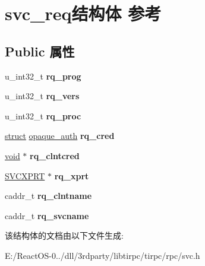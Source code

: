 \hypertarget{structsvc__req}{}\section{svc\+\_\+req结构体 参考}
\label{structsvc__req}
\subsection*{Public 属性}
\begin{DoxyCompactItemize}
\item 
\mbox{\label{structsvc__req_a0e8de24cec109d81d27debb3e7a718db}} 
u\+\_\+int32\+\_\+t {\bfseries rq\+\_\+prog}
\item 
\mbox{\label{structsvc__req_adc3f8c3e89ebdafdd6bf1cea8b033116}} 
u\+\_\+int32\+\_\+t {\bfseries rq\+\_\+vers}
\item 
\mbox{\label{structsvc__req_a3a9ae23ba2a7aa5790107cd16caaeaa9}} 
u\+\_\+int32\+\_\+t {\bfseries rq\+\_\+proc}
\item 
\mbox{\label{structsvc__req_a33e405bde020a2c8c2cecb6a4676103a}} 
\hyperlink{interfacestruct}{struct} \hyperlink{structopaque__auth}{opaque\+\_\+auth} {\bfseries rq\+\_\+cred}
\item 
\mbox{\label{structsvc__req_a29b1a269d90c61a61d71de14153e3135}} 
\hyperlink{interfacevoid}{void} $\ast$ {\bfseries rq\+\_\+clntcred}
\item 
\mbox{\label{structsvc__req_acf732f85845d8cc970eba9f7d2702b40}} 
\hyperlink{struct____rpc__svcxprt}{S\+V\+C\+X\+P\+RT} $\ast$ {\bfseries rq\+\_\+xprt}
\item 
\mbox{\label{structsvc__req_a1e9a5b1568a1cbab9f8d48177b9c4780}} 
caddr\+\_\+t {\bfseries rq\+\_\+clntname}
\item 
\mbox{\label{structsvc__req_a79c10074b7ea7773d5da019f3d1f3456}} 
caddr\+\_\+t {\bfseries rq\+\_\+svcname}
\end{DoxyCompactItemize}


该结构体的文档由以下文件生成\+:\begin{DoxyCompactItemize}
\item 
E\+:/\+React\+O\+S-\/0../dll/3rdparty/libtirpc/tirpc/rpc/svc.\+h\end{DoxyCompactItemize}
